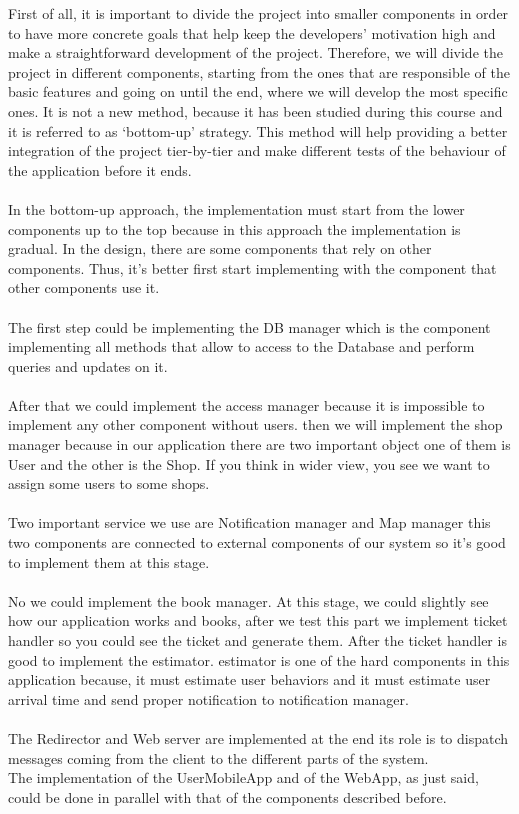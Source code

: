 First of all, it is important to divide the project into smaller components in order to have more concrete goals that help keep the developers’ motivation high and make a straightforward development of the project. Therefore, we will divide the project in different components, starting from the ones that are responsible of the basic features and going on until the end, where we will develop the most specific ones. It is not a new method, because it has been studied during this course and it is referred to as ‘bottom-up’ strategy. This method will help providing a better integration of the project tier-by-tier and make different tests of the behaviour of the application before it ends.\\ \\
In the bottom-up approach, the implementation must start from the lower components up to the top because in this approach the implementation is gradual. In the design, there are some components that rely on other components. Thus, it's better first start implementing with the component that other components use it.\\ \\
The first step could be implementing the DB manager which is the component implementing all methods that allow to access to the Database and perform queries and updates on it.\\ \\
After that we could implement the access manager because it is impossible to implement any other component without users. then we will implement the shop manager because in our application there are two important object one of them is User and the other is the Shop. If you think in wider view, you see we want to assign some users to some shops.\\ \\
Two important service we use are Notification manager and Map manager this two components are connected to external components of our system so it's good to implement them at this stage.\\ \\
No we could implement the book manager. At this stage, we could slightly see how our application works and books, after we test this part we implement ticket handler so you could see the ticket and generate them. After the ticket handler is good to implement the estimator. estimator is one of the hard components in this application because, it must estimate user behaviors and it must estimate user arrival time and send proper notification to notification manager.\\ \\
The Redirector and Web server are implemented at the end its role is to dispatch messages coming from the client to the different parts of the system.\\
The implementation of the UserMobileApp and of the WebApp, as just said, could be done in parallel with that of the components described before.

